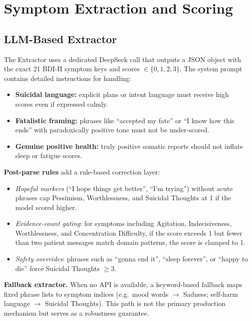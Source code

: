\documentclass[]{ceurart}
\begin{document}
\section{Symptom Extraction and Scoring}\label{sec:scoring}

\subsection{LLM-Based Extractor}\label{sec:extractor}

The Extractor uses a dedicated DeepSeek call that outputs a JSON object with the exact 21 BDI-II symptom keys and scores $\in \{0, 1, 2, 3\}$.
The system prompt contains detailed instructions for handling:

\begin{itemize}
\item \textbf{Suicidal language:} explicit plans or intent language must receive high scores even if expressed calmly.
\item \textbf{Fatalistic framing:} phrases like ``accepted my fate'' or ``I know how this ends'' with paradoxically positive tone must not be under-scored.
\item \textbf{Genuine positive health:} truly positive somatic reports should not inflate sleep or fatigue scores.
\end{itemize}

\textbf{Post-parse rules} add a rule-based correction layer:
\begin{itemize}
\item \emph{Hopeful markers} (``I hope things get better'', ``I'm trying'') without acute phrases cap Pessimism, Worthlessness, and Suicidal Thoughts at 1 if the model scored higher.
\item \emph{Evidence-count gating}: for symptoms including Agitation, Indecisiveness, Worthlessness, and Concentration Difficulty, if the score exceeds 1 but fewer than two patient messages match domain patterns, the score is clamped to 1.
\item \emph{Safety overrides}: phrases such as ``gonna end it'', ``sleep forever'', or ``happy to die'' force Suicidal Thoughts $\geq 3$.
\end{itemize}

\textbf{Fallback extractor.}
When no API is available, a keyword-based fallback maps fixed phrase lists to symptom indices (e.g.\ mood words $\to$ Sadness; self-harm language $\to$ Suicidal Thoughts).
This path is not the primary production mechanism but serves as a robustness guarantee.
\end{document}
